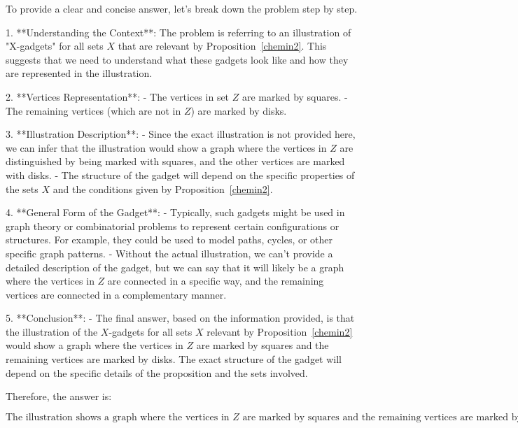 To provide a clear and concise answer, let's break down the problem step by step.

1. **Understanding the Context**: The problem is referring to an illustration of "X-gadgets" for all sets \( X \) that are relevant by Proposition~\ref{chemin2}. This suggests that we need to understand what these gadgets look like and how they are represented in the illustration.

2. **Vertices Representation**:
   - The vertices in set \( Z \) are marked by squares.
   - The remaining vertices (which are not in \( Z \)) are marked by disks.

3. **Illustration Description**:
   - Since the exact illustration is not provided here, we can infer that the illustration would show a graph where the vertices in \( Z \) are distinguished by being marked with squares, and the other vertices are marked with disks.
   - The structure of the gadget will depend on the specific properties of the sets \( X \) and the conditions given by Proposition~\ref{chemin2}.

4. **General Form of the Gadget**:
   - Typically, such gadgets might be used in graph theory or combinatorial problems to represent certain configurations or structures. For example, they could be used to model paths, cycles, or other specific graph patterns.
   - Without the actual illustration, we can't provide a detailed description of the gadget, but we can say that it will likely be a graph where the vertices in \( Z \) are connected in a specific way, and the remaining vertices are connected in a complementary manner.

5. **Conclusion**:
   - The final answer, based on the information provided, is that the illustration of the \( X \)-gadgets for all sets \( X \) relevant by Proposition~\ref{chemin2} would show a graph where the vertices in \( Z \) are marked by squares and the remaining vertices are marked by disks. The exact structure of the gadget will depend on the specific details of the proposition and the sets involved.

Therefore, the answer is:

\[
\boxed{\text{The illustration shows a graph where the vertices in } Z \text{ are marked by squares and the remaining vertices are marked by disks.}}
\]